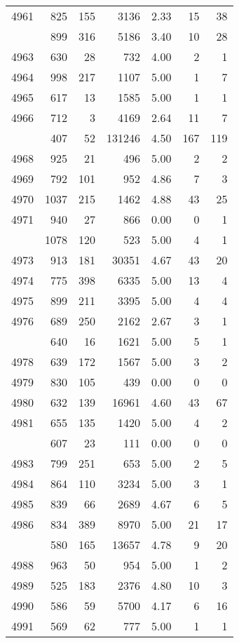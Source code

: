 \documentclass[
]{article}
\begin{document}
\begin{table}
\begin{tabular}[t]{lrrrrrr}
4961 & 825 & 155 & 3136 & 2.33 & 15 & 38\\
\addlinespace
4962 & 899 & 316 & 5186 & 3.40 & 10 & 28\\
4963 & 630 & 28 & 732 & 4.00 & 2 & 1\\
4964 & 998 & 217 & 1107 & 5.00 & 1 & 7\\
4965 & 617 & 13 & 1585 & 5.00 & 1 & 1\\
4966 & 712 & 3 & 4169 & 2.64 & 11 & 7\\
\addlinespace
4967 & 407 & 52 & 131246 & 4.50 & 167 & 119\\
4968 & 925 & 21 & 496 & 5.00 & 2 & 2\\
4969 & 792 & 101 & 952 & 4.86 & 7 & 3\\
4970 & 1037 & 215 & 1462 & 4.88 & 43 & 25\\
4971 & 940 & 27 & 866 & 0.00 & 0 & 1\\
\addlinespace
4972 & 1078 & 120 & 523 & 5.00 & 4 & 1\\
4973 & 913 & 181 & 30351 & 4.67 & 43 & 20\\
4974 & 775 & 398 & 6335 & 5.00 & 13 & 4\\
4975 & 899 & 211 & 3395 & 5.00 & 4 & 4\\
4976 & 689 & 250 & 2162 & 2.67 & 3 & 1\\
\addlinespace
4977 & 640 & 16 & 1621 & 5.00 & 5 & 1\\
4978 & 639 & 172 & 1567 & 5.00 & 3 & 2\\
4979 & 830 & 105 & 439 & 0.00 & 0 & 0\\
4980 & 632 & 139 & 16961 & 4.60 & 43 & 67\\
4981 & 655 & 135 & 1420 & 5.00 & 4 & 2\\
\addlinespace
4982 & 607 & 23 & 111 & 0.00 & 0 & 0\\
4983 & 799 & 251 & 653 & 5.00 & 2 & 5\\
4984 & 864 & 110 & 3234 & 5.00 & 3 & 1\\
4985 & 839 & 66 & 2689 & 4.67 & 6 & 5\\
4986 & 834 & 389 & 8970 & 5.00 & 21 & 17\\
\addlinespace
4987 & 580 & 165 & 13657 & 4.78 & 9 & 20\\
4988 & 963 & 50 & 954 & 5.00 & 1 & 2\\
4989 & 525 & 183 & 2376 & 4.80 & 10 & 3\\
4990 & 586 & 59 & 5700 & 4.17 & 6 & 16\\
4991 & 569 & 62 & 777 & 5.00 & 1 & 1\\

\end{tabular}
\end{table}
\end{document}
